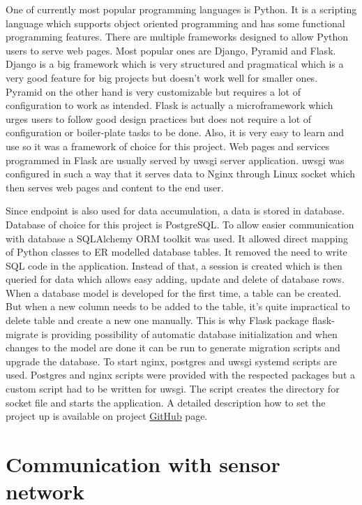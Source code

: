 One of currently most popular programming languages is Python. It is a scripting language which supports object oriented programming and has some functional programming features. There are multiple frameworks designed to allow Python users to serve web pages. Most popular ones are Django, Pyramid and Flask. Django is a big framework which is very structured and pragmatical which is a very good feature for big projects but doesn't work well for smaller ones. Pyramid on the other hand is very customizable but requires a lot of configuration to work as intended. Flask is actually a microframework which urges users to follow good design practices but does not require a lot of configuration or boiler-plate tasks to be done. Also, it is very easy to learn and use so it was a framework of choice for this project\cite{flask}. Web pages and services programmed in Flask are usually served by uwsgi server application. uwsgi was configured in such a way that it serves data to Nginx through Linux socket which then serves web pages and content to the end user.

Since endpoint is also used for data accumulation, a data is stored in database. Database of choice for this project is PostgreSQL\cite{postgres}. To allow easier communication with database a SQLAlchemy \ac{ORM} toolkit was used. It allowed direct mapping of Python classes to ER modelled database tables. It removed the need to write SQL code in the application. Instead of that, a session is created which is then queried for data which allows easy adding, update and delete of database rows. When a database model is developed for the first time, a table can be created. But when a new column needs to be added to the table, it's quite impractical to delete table and create a new one manually. This is why Flask package flask-migrate is providing possibility of automatic database initialization and when changes to the model are done it can be run to generate migration scripts and upgrade the database. To start nginx, postgres and uwsgi systemd scripts are used. Postgres and nginx scripts were provided with the respected packages but a custom script had to be written for uwsgi. The script creates the directory for socket file and starts the application. A detailed description how to set the project up is available on project \href{github.com/Xenosb/thesis-edison}{GitHub} page.


\section{Communication with sensor network}


